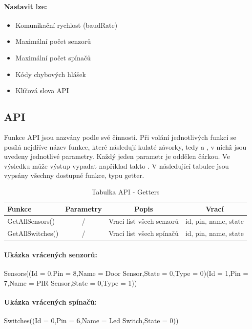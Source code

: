 \documentclass[FM,DP]{tulthesis}  %
\begin{document}
\paragraph{Nastavit lze:}
\begin{itemize}
\item Komunikační rychlost (baudRate)
\item Maximální počet senzorů
\item Maximální počet spínačů
\item Kódy chybových hlášek
\item Klíčová slova API
\end{itemize} 

\subsection{API}
Funkce API jsou nazvány podle své činnosti. Při volání jednotlivých funkcí se posílá nejdříve název funkce, které následují kulaté závorky, tedy \uv{(} a \uv{)}, v nichž jsou uvedeny jednotlivé parametry. Každý jeden parametr je oddělen čárkou. Ve výsledku může výstup vypadat například takto . V následující tabulce jsou vypsány všechny dostupné funkce, typu getter.

\renewcommand{\arraystretch}{1.5}
\begin{table}[H]
\begin{center}
\begin{tabular}{| l | c | c| c |}
\hline
Funkce & Parametry & Popis & Vrací\\
\hline
\hline
GetAllSensors() & / & Vrací list všech senzorů & id, pin, name, state \\
\hline
GetAllSwitches() & / & Vrací list všech spínačů & id, pin, name, state \\
\hline
\end{tabular}
\end{center}
\caption{Tabulka API - Getters}
\end{table}

\paragraph{Ukázka vrácených senzorů:}
\begin{center}
Sensors((Id = 0,Pin = 8,Name = Door Sensor,State = 0,Type = 0)(Id = 1,Pin = 7,Name = PIR Sensor,State = 0,Type = 1))
\end{center} 

\paragraph{Ukázka vrácených spínačů:}
\begin{center}
Switches((Id = 0,Pin = 6,Name = Led Switch,State = 0))
\end{center} 
\end{document}
